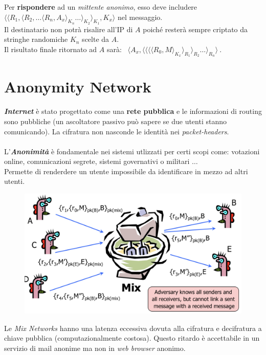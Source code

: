 \documentclass[11pt, a4paper, twoside, italian]{report}
\theoremstyle{plain}
\begin{document}
\noindent
Per \textbf{rispondere} ad un \textit{mittente anonimo}, esso deve includere $ \langle \langle R_1, \langle R_2, \dots \langle R_n, A_x \rangle_{K_n} \dots \rangle_{K_2} \rangle_{K_1}, K_x \rangle $ nel messaggio.\\
Il destinatario non potrà risalire all'IP di $A$ poiché resterà sempre criptato da stringhe randomiche $K_n$ scelte da $A$.\\
Il risultato finale ritornato ad $A$ sarà: ~$ \langle A_x, \langle \langle \langle \langle R_0, M \rangle_{K_x} \rangle_{R_1} \rangle_{R_2} \dots \rangle_{R_n} \rangle \ $.


\section*{Anonymity Network}
\begin{multicols}{2}
	\noindent
	\textbf{\textit{Internet}} è stato progettato come una \textbf{rete pubblica} e le informazioni di routing sono pubbliche (un ascoltatore passivo può sapere se due utenti stanno comunicando). La cifratura non nasconde le identità nei \textit{packet-headers}.\\\\
	L'\textit{\textbf{Anonimità}} è fondamentale nei sistemi utlizzati per certi scopi come: votazioni online, comunicazioni segrete, sistemi governativi o militari $\dots$\\
	Permette di renderdere un utente impossibile da identificare in mezzo ad altri utenti.
\columnbreak
	\begin{figure}[H]
		\centering
		\includegraphics[scale=0.45]{mixan}
	\end{figure}
\end{multicols}
\noindent
Le \textit{Mix Networks} hanno una latenza eccessiva dovuta alla cifratura e decifratura a chiave pubblica (computazionalmente costosa). Questo ritardo è accettabile in un servizio di mail anonime ma non in \textit{web browser} anonimo.
\end{document}
